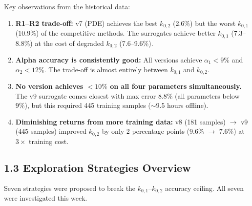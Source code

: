\documentclass[11pt]{article}
\begin{document}
Key observations from the historical data:
\begin{enumerate}
  \item \textbf{R1--R2 trade-off:} v7 (PDE) achieves the best $k_{0,2}$
        (2.6\%) but the worst $k_{0,1}$ (10.9\%) of the competitive methods.
        The surrogates achieve better $k_{0,1}$ (7.3--8.8\%) at the cost of
        degraded $k_{0,2}$ (7.6--9.6\%).

  \item \textbf{Alpha accuracy is consistently good:} All versions achieve
        $\alpha_1 < 9\%$ and $\alpha_2 < 12\%$.  The trade-off is almost
        entirely between $k_{0,1}$ and $k_{0,2}$.

  \item \textbf{No version achieves $<10\%$ on all four parameters
        simultaneously.}  The v9 surrogate comes closest with max error 8.8\%
        (all parameters below 9\%), but this required 445 training samples
        (${\sim}9.5$ hours offline).

  \item \textbf{Diminishing returns from more training data:} v8 (181 samples)
        $\to$ v9 (445 samples) improved $k_{0,2}$ by only 2 percentage points
        (9.6\% $\to$ 7.6\%) at $3\times$ training cost.
\end{enumerate}


\subsection*{1.3 Exploration Strategies Overview}

Seven strategies were proposed to break the $k_{0,1}$--$k_{0,2}$ accuracy
ceiling.  All seven were investigated this week.
\end{document}
